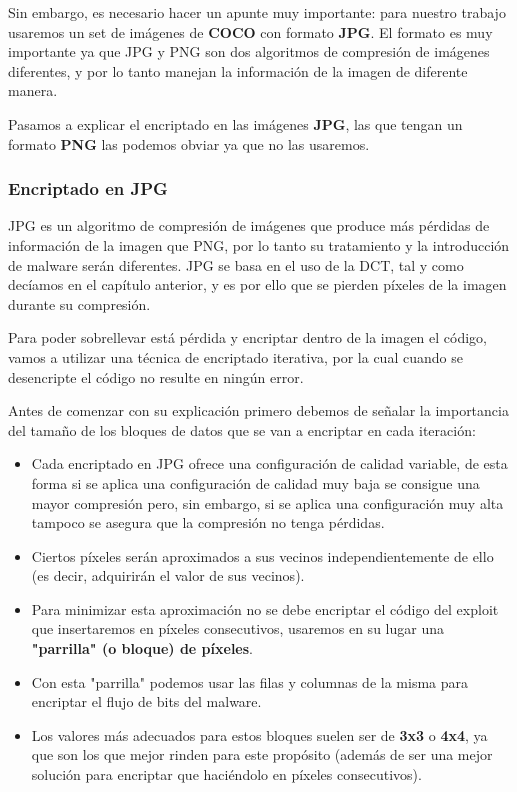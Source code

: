 Sin embargo, es necesario hacer un apunte muy importante: para nuestro trabajo usaremos un set de imágenes de \textbf{COCO} con formato \textbf{JPG}. El formato es muy importante ya que JPG y PNG son dos algoritmos de compresión de imágenes diferentes, y por lo tanto manejan la información de la imagen de diferente manera. %

Pasamos a explicar el encriptado en las imágenes \textbf{JPG}, las que tengan un formato \textbf{PNG} las podemos obviar ya que no las usaremos.

\subsubsection{Encriptado en JPG}

JPG es un algoritmo de compresión de imágenes que produce más pérdidas de información de la imagen que PNG, por lo tanto su tratamiento y la introducción de malware serán diferentes. JPG se basa en el uso de la \ac{DCT}, tal y como decíamos en el capítulo anterior, y es por ello que se pierden píxeles de la imagen durante su compresión. %

Para poder sobrellevar está pérdida y encriptar dentro de la imagen el código, vamos a utilizar una técnica de encriptado iterativa, por la cual cuando se desencripte el código no resulte en ningún error.

Antes de comenzar con su explicación primero debemos de señalar la importancia del tamaño de los bloques de datos que se van a encriptar en cada iteración: 

\begin{itemize}
\item Cada encriptado en JPG ofrece una configuración de calidad variable, de esta forma si se aplica una configuración de calidad muy baja se consigue una mayor compresión pero, sin embargo, si se aplica una configuración muy alta tampoco se asegura que la compresión no tenga pérdidas.
\item Ciertos píxeles serán aproximados a sus vecinos independientemente de ello (es decir, adquirirán el valor de sus vecinos).
\item Para minimizar esta aproximación no se debe encriptar el código del exploit que insertaremos en píxeles consecutivos, usaremos en su lugar una \textbf{"parrilla" (o bloque) de píxeles}.
\item Con esta "parrilla" podemos usar las filas y columnas de la misma para encriptar el flujo de bits del malware.
\item Los valores más adecuados para estos bloques suelen ser de \textbf{3x3} o \textbf{4x4}, ya que son los que mejor rinden para este propósito (además de ser una mejor solución para encriptar que haciéndolo en píxeles consecutivos).
\end{itemize}

